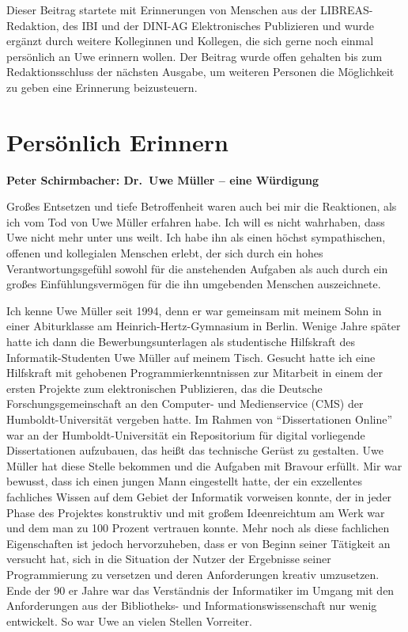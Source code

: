 \documentclass[a4paper,
fontsize=11pt,
oneside,
numbers=noperiodatend,
parskip=half-,
bibliography=totoc,
final
]{scrartcl}
\begin{document}
Dieser Beitrag startete mit Erinnerungen von Menschen aus der
LIBREAS-Redaktion, des IBI und der DINI-AG Elektronisches Publizieren
und wurde ergänzt durch weitere Kolleginnen und Kollegen, die sich gerne
noch einmal persönlich an Uwe erinnern wollen. Der Beitrag wurde offen gehalten bis zum Redaktionsschluss der nächsten Ausgabe, um weiteren Personen die Möglichkeit zu geben eine Erinnerung beizusteuern.

\hypertarget{persuxf6nlich-erinnern}{%
\section{Persönlich Erinnern}\label{persuxf6nlich-erinnern}}

\textbf{Peter Schirmbacher: Dr.~Uwe Müller -- eine Würdigung}

Großes Entsetzen und tiefe Betroffenheit waren auch bei mir die
Reaktionen, als ich vom Tod von Uwe Müller erfahren habe. Ich will es
nicht wahrhaben, dass Uwe nicht mehr unter uns weilt. Ich habe ihn als
einen höchst sympathischen, offenen und kollegialen Menschen erlebt, der
sich durch ein hohes Verantwortungsgefühl sowohl für die anstehenden
Aufgaben als auch durch ein großes Einfühlungsvermögen für die ihn
umgebenden Menschen auszeichnete.

Ich kenne Uwe Müller seit 1994, denn er war gemeinsam mit meinem Sohn in
einer Abiturklasse am Heinrich-Hertz-Gymnasium in Berlin. Wenige Jahre
später hatte ich dann die Bewerbungsunterlagen als studentische
Hilfskraft des Informatik-Studenten Uwe Müller auf meinem Tisch. Gesucht
hatte ich eine Hilfskraft mit gehobenen Programmierkenntnissen zur
Mitarbeit in einem der ersten Projekte zum elektronischen Publizieren,
das die Deutsche Forschungsgemeinschaft an den Computer- und
Medienservice (CMS) der Humboldt-Universität vergeben hatte. Im Rahmen
von \enquote{Dissertationen Online} war an der Humboldt-Universität ein
Repositorium für digital vorliegende Dissertationen aufzubauen, das
heißt das technische Gerüst zu gestalten. Uwe Müller hat diese Stelle
bekommen und die Aufgaben mit Bravour erfüllt. Mir war bewusst, dass ich
einen jungen Mann eingestellt hatte, der ein exzellentes fachliches
Wissen auf dem Gebiet der Informatik vorweisen konnte, der in jeder
Phase des Projektes konstruktiv und mit großem Ideenreichtum am Werk war
und dem man zu 100 Prozent vertrauen konnte. Mehr noch als diese
fachlichen Eigenschaften ist jedoch hervorzuheben, dass er von Beginn
seiner Tätigkeit an versucht hat, sich in die Situation der Nutzer der
Ergebnisse seiner Programmierung zu versetzen und deren Anforderungen
kreativ umzusetzen. Ende der 90 er Jahre war das Verständnis der
Informatiker im Umgang mit den Anforderungen aus der Bibliotheks- und
Informationswissenschaft nur wenig entwickelt. So war Uwe an vielen
Stellen Vorreiter.
\end{document}
